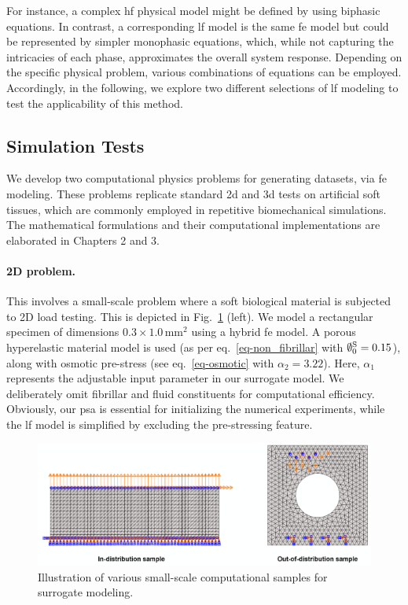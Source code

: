 \documentclass[12pt,a4paper]{report}
\begin{document}
For instance, a complex \ac{hf} physical model might be defined by using biphasic equations. In contrast, a corresponding \ac{lf} model is the same \ac{fe} model but could be represented by simpler monophasic equations, which, while not capturing the intricacies of each phase, approximates the overall system response. Depending on the specific physical problem, various combinations of equations can be employed. Accordingly, in the following, we explore two different selections of \ac{lf} modeling to test the applicability of this method.

\subsection{Simulation Tests}

We develop two computational physics problems for generating datasets, via \ac{fe} modeling. These problems replicate standard \ac{2d} and \ac{3d} tests on artificial soft tissues, which are commonly employed in repetitive biomechanical simulations. The mathematical formulations and their computational implementations are elaborated in Chapters 2 and 3.

\paragraph{2D problem.} This involves a small-scale problem where a soft biological material is subjected to 2D load testing. This is depicted in Fig.~\ref{fig:2d_model} (left). We model a rectangular specimen of dimensions $0.3 \times 1.0$\,mm$^2$ using a hybrid \ac{fe} model. A porous hyperelastic material model is used (as per eq.~\ref{eq-non_fibrillar} with $\emptyset_0^{\rm S}=0.15$), along with osmotic pre-stress (see eq.~\ref{eq-osmotic} with $\alpha_2 = 3.22$). Here, $\alpha_1$ represents the adjustable input parameter in our surrogate model. We deliberately omit fibrillar and fluid constituents for computational efficiency. Obviously, our \ac{psa} is essential for initializing the numerical experiments, while the \ac{lf} model is simplified by excluding the pre-stressing feature.
%
\begin{figure}\centering
\includegraphics[width=\linewidth]{2d_model.pdf}
\caption{Illustration of various small-scale computational samples for surrogate modeling.\label{fig:2d_model}}
\end{figure}
\end{document}
